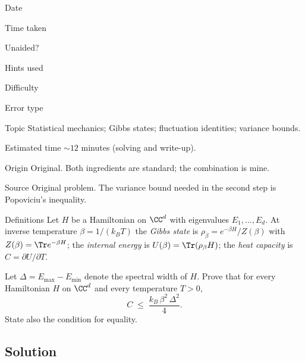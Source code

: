 \begin{takeaway}
\end{takeaway}

\begin{attemptlog}
  \item[Date] \todo{}
  \item[Time taken] \todo{}
  \item[Unaided?] \todo{}
  \item[Hints used] \todo{}
  \item[Difficulty] 
  \item[Error type] 
\end{attemptlog}


\begin{daymeta}
  \item[Topic] Statistical mechanics; Gibbs states; fluctuation identities; variance bounds.
  \item[Estimated time] $\sim 12$ minutes (solving and write-up).
  \item[Origin] Original. Both ingredients are standard; the combination is mine.
  \item[Source] Original problem. The variance bound needed in the second step is
    Popoviciu's inequality.
  \item[Definitions] Let $H$ be a Hamiltonian on $\CC^{d}$ with eigenvalues
    $E_1,\dots,E_d$. At inverse temperature $\beta=1/(k_BT)$ the \emph{Gibbs state} is
    $\rho_\beta=e^{-\beta H}/Z(\beta)$ with $Z(\beta)=\Tr e^{-\beta H}$; the
    \emph{internal energy} is $U(\beta)=\Tr(\rho_\beta H)$; the \emph{heat capacity} is
    $C=\partial U/\partial T$.
\end{daymeta}

\begin{problem}
Let $\Delta=E_{\max}-E_{\min}$ denote the spectral width of $H$. Prove that for every
Hamiltonian $H$ on $\CC^{d}$ and every temperature $T>0$,
\[
  C \;\le\; \frac{k_B\,\beta^{2}\,\Delta^{2}}{4}.
\]
State also the condition for equality.
\end{problem}

\subsection*{Solution}

